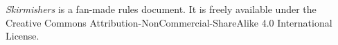 \emph{Skirmishers} is a fan-made rules document.
It is freely available under the Creative Commons Attribution-NonCommercial-ShareAlike 4.0 International License.
